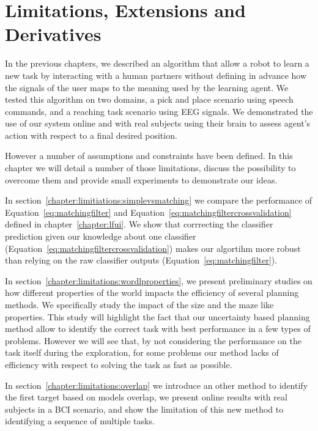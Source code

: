 
%
\chapter{Limitations, Extensions and Derivatives}
\label{chapter:limitations}
\minitoc

In the previous chapters, we described an algorithm that allow a robot to learn a new task by interacting with a human partners without defining in advance how the signals of the user maps to the meaning used by the learning agent. We tested this algorithm on two domains, a pick and place scenario using speech commands, and a reaching task scenario using EEG signals. We demonstrated the use of our system online and with real subjects using their brain to assess agent's action with respect to a final desired position.

However a number of assumptions and constraints have been defined. In this chapter we will detail a number of those limitations, discuss the possibility to overcome them and provide small experiments to demonstrate our ideas. 

In section~\ref{chapter:limitiations:simplevsmatching} we compare the performance of Equation~\ref{eq:matchingfilter} and Equation~\ref{eq:matchingfiltercrossvalidation} defined in chapter~\ref{chapter:lfui}. We show that corrrecting the classifier prediction given our knowledge about one classifier (Equation~\ref{eq:matchingfiltercrossvalidation}) makes our algortihm more robust than relying on the raw classifier outputs (Equation~\ref{eq:matchingfilter}).

In section~\ref{chapter:limitations:wordlproperties}, we present preliminary studies on how different properties of the world impacts the efficiency of several planning methods. We specifically study the impact of the size and the maze like properties. This study will highlight the fact that our uncertainty based planning method allow to identify the correct task with best performance in a few types of problems. However we will see that, by not considering the performance on the task itself during the exploration, for some problems our method lacks of efficiency with respect to solving the task as fast as possible.

In section~\ref{chapter:limitations:overlap} we introduce an other method to identify the first target based on models overlap, we present online results with real subjects in a BCI scenario, and show the limitation of this new method to identifying a sequence of multiple tasks.


